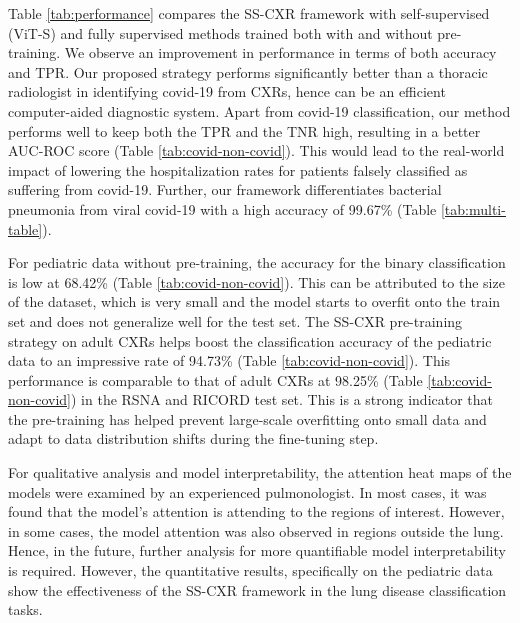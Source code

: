 \documentclass[10pt,journal,compsoc]{IEEEtran}
\begin{document}
Table \ref{tab:performance} compares the SS-CXR framework with self-supervised (ViT-S) and fully supervised methods trained both with and without pre-training. We observe an improvement in performance in terms of both accuracy and TPR. Our proposed strategy performs significantly better than a thoracic radiologist in identifying covid-19 from CXRs, hence can be an efficient computer-aided diagnostic system. Apart from covid-19 classification, our method performs well to keep both the TPR and the TNR high, resulting in a better AUC-ROC score (Table \ref{tab:covid-non-covid}). This would lead to the real-world impact of lowering the hospitalization rates for patients  falsely classified as suffering from covid-19. Further, our framework differentiates bacterial pneumonia from viral covid-19 with a high accuracy of 99.67\% (Table \ref{tab:multi-table}).

For pediatric data without pre-training, the accuracy for the binary classification is low at 68.42\% (Table \ref{tab:covid-non-covid}). This can be attributed to the size of the dataset, which is very small and the model starts to overfit onto the train set and does not generalize well for the test set. The SS-CXR pre-training strategy on adult CXRs helps boost the classification accuracy of the pediatric data to an impressive rate of 94.73\% (Table \ref{tab:covid-non-covid}).  This performance is comparable to that of adult CXRs at 98.25\% (Table \ref{tab:covid-non-covid}) in the RSNA \cite{rsna} and RICORD \cite{ricord} test set. This is a strong indicator that the pre-training has helped prevent large-scale overfitting onto small data and adapt to data distribution shifts during the fine-tuning step.

For qualitative analysis and model interpretability, the attention heat maps of the models were examined by an experienced pulmonologist. In most cases, it was found that the model's attention is attending to the regions of interest. However, in some cases, the model attention was also observed in regions outside the lung. Hence, in the future, further analysis for more quantifiable model interpretability is required. However, the quantitative results, specifically on the pediatric data show the effectiveness of the SS-CXR framework in the lung disease classification tasks.   
\end{document}
